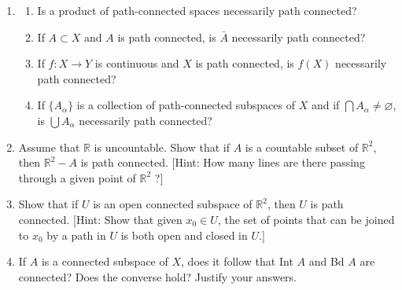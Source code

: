 \begin{enumerate}[itemsep=0.4em, parsep=0pt, topsep=0pt, partopsep=0pt, leftmargin=*, label=\arabic*., ref=\arabic*]
\begin{enumerate}[itemsep=0.2em, parsep=0pt, topsep=0pt, partopsep=0pt, leftmargin=*, label=(\alph*), align=left]
 \item Let \(X = Y = {\overline{\mathbb{R}}}_{ + }\). Given a positive integer \(n\), show that the function \(f(x) =\) \(x^{n}\) is order preserving and surjective. Conclude that its inverse, the nth root function, is continuous.
 \item Let \(X\) be the subspace \(( {-\infty , - 1}) \cup \lbrack 0,\infty )\) of \(\mathbb{R}\). Show that the function \(f : X \rightarrow \mathbb{R}\) defined by setting \(f(x) = x + 1\) if \(x < - 1\), and \(f(x) = x\) if \(x \geq 0\), is order preserving and surjective. Is \(f\) a homeomorphism? Compare with (a).
 \end{enumerate}
\item
 \begin{enumerate}[itemsep=0.2em, parsep=0pt, topsep=0pt, partopsep=0pt, leftmargin=*, label=(\alph*), align=left]
 \item Is a product of path-connected spaces necessarily path connected?

 \item If \(A \subset X\) and \(A\) is path connected, is \(\bar{A}\) necessarily path connected?
 \item If \(f : X \rightarrow Y\) is continuous and \(X\) is path connected, is \(f( X)\) necessarily path connected?
 \item If \(\{ A_{\alpha }\}\) is a collection of path-connected subspaces of \(X\) and if \(\bigcap {A}_{\alpha } \neq \varnothing\), is \(\bigcup {A}_{\alpha }\) necessarily path connected?
 \end{enumerate}
\item Assume that \(\mathbb{R}\) is uncountable. Show that if \(A\) is a countable subset of \(\mathbb{R}^{2}\), then \(\mathbb{R}^{2} - A\) is path connected. [Hint: How many lines are there passing through a given point of \(\mathbb{R}^{2}\) ?]
\item Show that if \(U\) is an open connected subspace of \(\mathbb{R}^{2}\), then \(U\) is path connected. [Hint: Show that given \(x_{0} \in U\), the set of points that can be joined to \(x_{0}\) by a path in \(U\) is both open and closed in \(U\).]
\item If \(A\) is a connected subspace of \(X\), does it follow that Int \(A\) and Bd \(A\) are connected? Does the converse hold? Justify your answers.


\end{enumerate}
